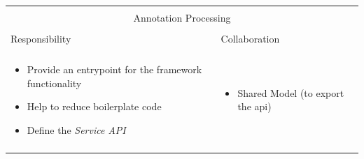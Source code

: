 \noindent
\begin{tabular}{|l|l|}
    \cline{1-2}
    \multicolumn{2}{|c|}{} \\[-0.3cm]
    \multicolumn{2}{|c|}{Annotation Processing} \\ 
    \multicolumn{2}{|c|}{} \\[-0.3cm]
    \cline{1-2}
    Responsibility & Collaboration \\
    \cline{1-2}
    & \\[-0.2cm]
    \begin{minipage}{0.47\textwidth}
        \begin{itemize}
          \item Provide an entrypoint for the framework
          functionality\footnotemark
          \item Help to reduce boilerplate code 
          \item Define the \textit{Service API}
        \end{itemize} 
    \end{minipage}
	&
    \begin{minipage}{0.47\textwidth}
        \begin{itemize}
          \item Shared Model (to export the \gls{api})
        \end{itemize} 
    \end{minipage}
	\\ & \\
    \hline
\end{tabular}

          
